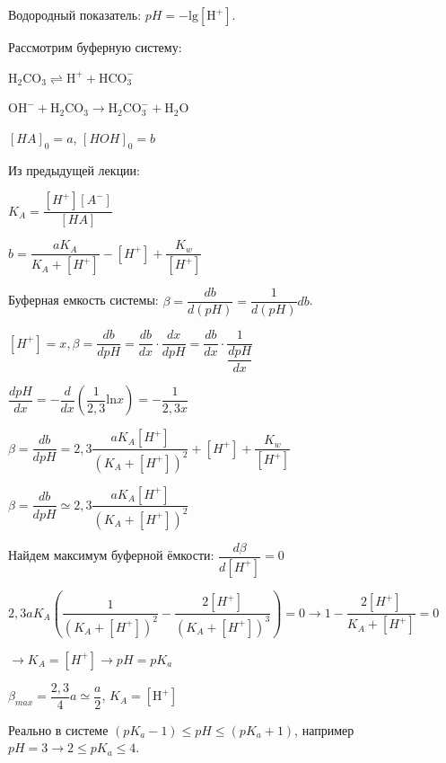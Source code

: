 
\begin{lecture}
	\begin{lecSection}
			\begin{definition}
			Водородный показатель: $pH = -\mathrm{lg}\left[\mathrm{H^+}\right]$.
		\end{definition}
	\begin{center}
	Рассмотрим буферную систему:
	\par $\mathrm{H_2CO_3 \rightleftharpoons H^+ + HCO_3^-}$
	\par $ \mathrm{OH^- + H_2CO_3 \rightarrow H_2CO_3^- + H_2O}$
	\par $ [HA]_0 = a $, $ [HOH]_0 = b $
	\par Из предыдущей лекции:
	\par $	K_A = \dfrac{[H^+] [A^-]}{[HA]}$
	\par $b = \dfrac{a K_A}{K_A + [H^+]} - [H^+] + \dfrac{ K_w }{ [H^+] }$
	\end{center}
	\begin{definition}
		Буферная емкость системы: $\beta = \dfrac{db}{d(pH)} = \dfrac{1}{d(pH)}{db}$.
	\end{definition}
	\begin{center}
	$[H^+] = x, \beta = \dfrac{db}{dpH} = \dfrac{db}{dx} \cdot \dfrac{dx}{dpH} = \dfrac{db}{dx} \cdot \dfrac{1}{\dfrac{dpH}{dx}}$
	\par $\dfrac{dpH}{dx} = - \dfrac{d}{dx}(\dfrac{1}{2,3}\mathrm{ln}x) = - \dfrac{1}{2,3x}$
	\par $\beta = \dfrac{db}{dpH} = 2,3\dfrac{a K_A[H^+]}{(K_A + [H^+])^2} + [H^+] + \dfrac{ K_w }{ [H^+] }$
	\par $\beta = \dfrac{db}{dpH} \simeq 2,3 \dfrac{a K_A[H^+]}{(K_A + [H^+])^2}$
	\par Найдем максимум буферной ёмкости: $\dfrac{d\beta}{d[H^+]} = 0$
	\par $2,3aK_A\left(\dfrac{1}{(K_A+[H^+])^2}-\dfrac{2[H^+]}{(K_A + [H^+])^3}\right) = 0 \rightarrow 1-\dfrac{2[H^+]}{K_A + [H^+]} = 0$
	\par $\rightarrow K_A = [H^+] \rightarrow pH = pK_a$
	\par $\beta_{max} = \dfrac{2,3}{4}a \simeq \dfrac{a}{2}$, $K_A = [\mathrm{H^+}]$
	\par Реально в системе $(pK_a - 1) \leq pH \leq (pK_a + 1)$, например $pH = 3 \rightarrow 2 \leq pK_a \leq 4$.
	\end{center}
	\begin{figure}[H]

\end{figure}
\end{lecSection}
\end{lecture}
